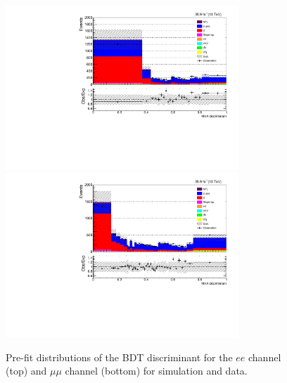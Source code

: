 \begin{figure}[h]
\centering
\includegraphics[width=0.78\textwidth]{figs/results/prefit_ee.pdf}
\\
\includegraphics[width=0.78\textwidth]{figs/results/prefit_mumu.pdf}
\caption{
Pre-fit distributions of the BDT discriminant for the $ee$ channel (top) and $\mu\mu$ channel (bottom) for simulation and data. }
\label{fig:prefitBDT}
\end{figure}
